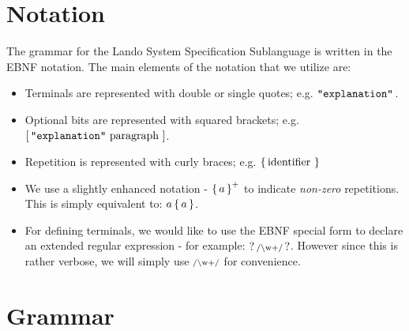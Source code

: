 \documentclass{article}
\begin{document}
\section{Notation}

The grammar for the Lando System Specification Sublanguage is written in the EBNF notation. The main elements of the notation that we utilize are:
\begin{itemize}
  \item Terminals are represented with double or single quotes; e.g. $\mathop{\texttt{"explanation"}}\,$.
  \item Optional bits are represented with squared brackets; e.g. $\mathop{\operatorname{[} \mathop{\texttt{"explanation"}}\, \mathop{\textrm{paragraph}}\, \operatorname{]}}$.
  \item Repetition is represented with curly braces; e.g. $\mathop{\operatorname{\{} \mathop{\textrm{identifier}}\, \operatorname{\}}}$
  \item We use a slightly enhanced notation - $\mathop{\operatorname{\{} a \operatorname{\}}^+}$ to indicate \emph{non-zero} repetitions. This is simply equivalent to: $a \mathop{\operatorname{\{} a \operatorname{\}}}$.
  \item For defining terminals, we would like to use the EBNF special form to declare an extended regular expression - for example: $\mathop{?\, \textrm{\scriptsize /\textbackslash w\\+/} \,?}$. However since this is rather verbose, we will simply use $\textrm{\scriptsize /\textrm{\textbackslash w\\+}/}$ for convenience.
\end{itemize}

\section{Grammar}
\end{document}
